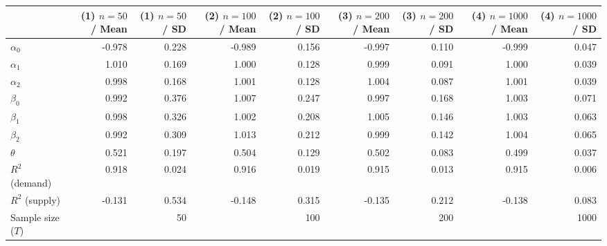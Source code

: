 
\begin{tabular}[t]{lrrrrrrrr}
\toprule
  & (1) $n=50$ / Mean & (1) $n=50$ / SD & (2) $n=100$ / Mean & (2) $n=100$ / SD & (3) $n=200$ / Mean & (3) $n=200$ / SD & (4) $n=1000$ / Mean & (4) $n=1000$ / SD\\
\midrule
$\alpha_{0}$ & -0.978 & 0.228 & -0.989 & 0.156 & -0.997 & 0.110 & -0.999 & 0.047\\
$\alpha_{1}$ & 1.010 & 0.169 & 1.000 & 0.128 & 0.999 & 0.091 & 1.000 & 0.039\\
$\alpha_{2}$ & 0.998 & 0.168 & 1.001 & 0.128 & 1.004 & 0.087 & 1.001 & 0.039\\
$\beta_{0}$ & 0.992 & 0.376 & 1.007 & 0.247 & 0.997 & 0.168 & 1.003 & 0.071\\
$\beta_{1}$ & 0.998 & 0.326 & 1.002 & 0.208 & 1.005 & 0.146 & 1.003 & 0.063\\
$\beta_{2}$ & 0.992 & 0.309 & 1.013 & 0.212 & 0.999 & 0.142 & 1.004 & 0.065\\
$\theta$ & 0.521 & 0.197 & 0.504 & 0.129 & 0.502 & 0.083 & 0.499 & 0.037\\
$R^{2}$ (demand) & 0.918 & 0.024 & 0.916 & 0.019 & 0.915 & 0.013 & 0.915 & 0.006\\
$R^{2}$ (supply) & -0.131 & 0.534 & -0.148 & 0.315 & -0.135 & 0.212 & -0.138 & 0.083\\
Sample size ($T$) &  & 50 &  & 100 &  & 200 &  & 1000\\
\bottomrule
\end{tabular}
